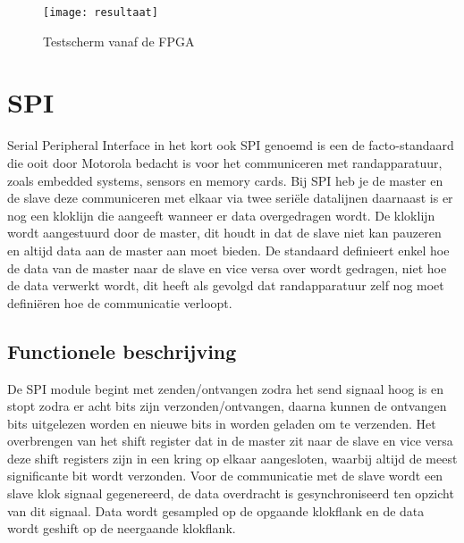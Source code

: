 \documentclass[oneside,dutch]{tudelft-report}
\begin{document}
\begin{figure}[H]
\center
\texttt{[image: resultaat]}
\caption{Testscherm vanaf de FPGA}
\label{VGA}
\end{figure}

\chapter{SPI}
Serial Peripheral Interface in het kort ook SPI genoemd is een de facto-standaard die ooit door Motorola bedacht is voor het communiceren met randapparatuur, zoals embedded systems, sensors en memory cards. Bij SPI heb je de master en de slave deze communiceren met elkaar via twee seriële datalijnen daarnaast is er nog een kloklijn die aangeeft wanneer er data overgedragen wordt. De kloklijn wordt aangestuurd door de master, dit houdt in dat de slave niet kan pauzeren en altijd data aan de master aan moet bieden. De standaard definieert enkel hoe de data van de master naar de slave en vice versa over wordt gedragen, niet hoe de data verwerkt wordt, dit heeft als gevolgd dat randapparatuur zelf nog moet definiëren hoe de communicatie verloopt.

\section{Functionele beschrijving}
De SPI module begint met zenden/ontvangen zodra het send signaal hoog is en stopt zodra er acht bits zijn verzonden/ontvangen, daarna kunnen de ontvangen bits uitgelezen worden en nieuwe bits in worden geladen om te verzenden. Het overbrengen van het shift register dat in de master zit naar de slave en vice versa deze shift registers zijn in een kring op elkaar aangesloten, waarbij altijd de meest significante bit wordt verzonden. Voor de communicatie met de slave wordt een slave klok signaal gegenereerd, de data overdracht is gesynchroniseerd ten opzicht van dit signaal. Data wordt gesampled op de opgaande klokflank en de data wordt geshift op de neergaande klokflank.
\end{document}
